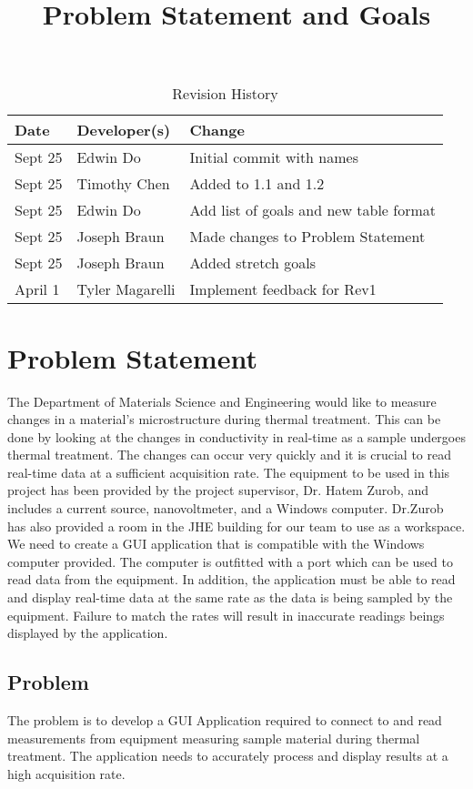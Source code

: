 \documentclass[12pt, titlepage]{article}
\title{Problem Statement and Goals\\\progname}
\author{\authname}
\date{}
\begin{document}
\maketitle

\begin{table}[hp]
\caption{Revision History} \label{TblRevisionHistory}
\begin{tabularx}{\textwidth}{llX}
\toprule
\textbf{Date} & \textbf{Developer(s)} & \textbf{Change}\\
\midrule
Sept 25 & Edwin Do & Initial commit with names\\
Sept 25 & Timothy Chen & Added to 1.1 and 1.2 \\
Sept 25 & Edwin Do & Add list of goals and new table format\\
Sept 25 & Joseph Braun & Made changes to Problem Statement \\
Sept 25 & Joseph Braun & Added stretch goals \\
April 1 & Tyler Magarelli & Implement feedback for Rev1 \\
\bottomrule
\end{tabularx}
\end{table}

\section{Problem Statement}
The Department of Materials Science and Engineering would like to measure changes in a material's microstructure
during thermal treatment. This can be done by looking at the changes in conductivity in real-time as a sample undergoes 
thermal treatment. The changes can occur very quickly and it is crucial to read real-time data at a sufficient acquisition rate.
The equipment to be used in this project has been provided by the project supervisor, Dr. Hatem Zurob, and includes a current source, nanovoltmeter, and a Windows computer. 
Dr.Zurob has also provided a room in the JHE building for our team to use as a workspace. 
We need to create a GUI application that is compatible with the Windows computer provided.
The computer is outfitted with a port which can be used to read data from the equipment.
In addition, the application must be able to read and display real-time data at the same rate as the data is being sampled by the equipment. Failure to match the rates will result in inaccurate readings beings displayed by the application.

\subsection{Problem}
The problem is to develop a GUI Application required to connect to and read measurements from equipment measuring sample material during thermal treatment.
The application needs to accurately process and display results at a high acquisition rate.
\end{document}
